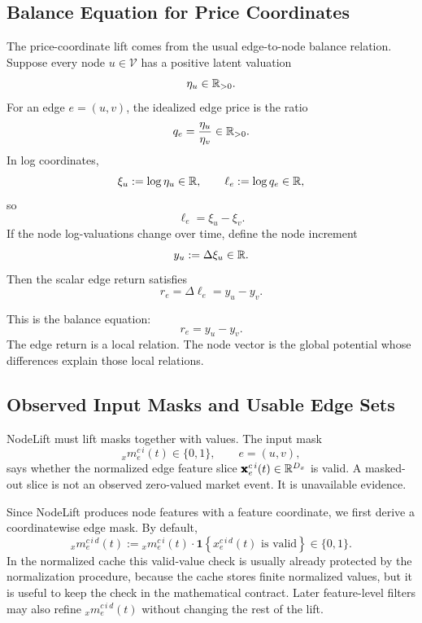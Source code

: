 
\subsection{Balance Equation for Price Coordinates}
\label{subsec:balance-equation-for-price-coordinates}

The price-coordinate lift comes from the usual edge-to-node balance relation.
Suppose every node $u\in\mathcal{V}$ has a positive latent valuation
\[
  \eta_u\in\mathbb{R}_{>0}.
\]
For an edge $e=(u,v)$, the idealized edge price is the ratio
\[
  q_e
  =
  \frac{\eta_u}{\eta_v}
  \in\mathbb{R}_{>0}.
\]
In log coordinates,
\[
  \xi_u := \log\eta_u\in\mathbb{R},
  \qquad
  \ell_e := \log q_e\in\mathbb{R},
\]
so
\[
  \ell_e
  =
  \xi_u-\xi_v.
\]
If the node log-valuations change over time, define the node increment
\[
  y_u := \Delta\xi_u\in\mathbb{R}.
\]
Then the scalar edge return satisfies
\[
  r_e
  =
  \Delta\ell_e
  =
  y_u-y_v.
\]

This is the balance equation:
\[
  r_e = y_u-y_v.
\]
The edge return is a local relation.  The node vector is the global potential
whose differences explain those local relations.

\subsection{Observed Input Masks and Usable Edge Sets}
\label{subsec:observed-input-masks-and-usable-edge-sets}

NodeLift must lift masks together with values.  The input mask
\[
  {}_{x}m_{e}^{c\,i}(t)
  \in
  \{0,1\},
  \qquad
  e=(u,v),
\]
says whether the normalized edge feature slice
$\pmb{\mathbf{x}}_{e}^{c\,i}(t)\in\mathbb{R}^{D_x}$ is valid.  A masked-out slice is not an
observed zero-valued market event.  It is unavailable evidence.

Since NodeLift produces node features with a feature coordinate, we first
derive a coordinatewise edge mask.  By default,
\[
  {}_{x}m_{e}^{c\,i\,d}(t)
  :=
  {}_{x}m_{e}^{c\,i}(t)
  \cdot
  \mathbf{1}
  \left\{
    x_{e}^{c\,i\,d}(t)
    \text{ is valid}
  \right\}
  \in
  \{0,1\}.
\]
In the normalized cache this valid-value check is usually already protected by
the normalization procedure, because the cache stores finite normalized values,
but it is useful to keep the check in the mathematical contract.  Later
feature-level filters may also refine ${}_{x}m_{e}^{c\,i\,d}(t)$ without
changing the rest of the lift.

